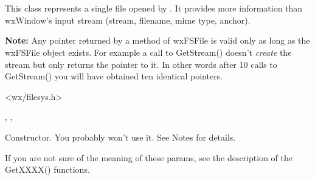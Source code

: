 %
%

\section{}\label{wxfsfile}

This class represents a single file opened by .
It provides more information than wxWindow's input stream 
(stream, filename, mime type, anchor).

{\bf Note:} Any pointer returned by a method of wxFSFile is valid
only as long as the wxFSFile object exists. For example a call to GetStream()
doesn't {\it create} the stream but only returns the pointer to it. In
other words after 10 calls to GetStream() you will have obtained ten identical
pointers.




<wx/filesys.h>


, 
, 


\label{wxfsfilewxfsfile}


Constructor. You probably won't use it. See Notes for details.






If you are not sure of the meaning of these params, see the description of the GetXXXX()
functions.

